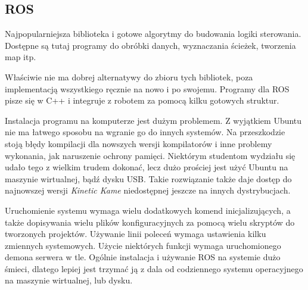 \subsection{ROS}
Najpopularniejsza biblioteka i gotowe algorytmy do budowania logiki sterowania.
Dostępne są tutaj programy do obróbki danych, wyznaczania ścieżek, tworzenia map itp.

Właściwie nie ma dobrej alternatywy do zbioru tych bibliotek, poza implementacją wszystkiego ręcznie na nowo i po swojemu.
Programy dla ROS pisze się w C++ i integruje z robotem za pomocą kilku gotowych struktur.

Instalacja programu na komputerze jest dużym problemem.
Z wyjątkiem Ubuntu nie ma łatwego sposobu na wgranie go do innych systemów.
Na przeszkodzie stoją błędy kompilacji dla nowszych wersji kompilatorów i inne problemy wykonania, jak naruszenie ochrony pamięci. 
Niektórym studentom wydziału się udało tego z wielkim trudem dokonać, lecz dużo prościej jest użyć Ubuntu na maszynie wirtualnej, bądź dysku USB.
Takie rozwiązanie także daje dostęp do najnowszej wersji \emph{Kinetic Kame} niedostępnej jeszcze na innych dystrybucjach.

Uruchomienie systemu wymaga wielu dodatkowych komend inicjalizujących, a także dopisywania wielu plików konfiguracyjnych za pomocą wielu skryptów do tworzonych projektów.
Używanie linii poleceń wymaga ustawienia kilku zmiennych systemowych.
Użycie niektórych funkcji wymaga uruchomionego demona serwera w tle.
Ogólnie instalacja i używanie ROS na systemie dużo śmieci, dlatego lepiej jest trzymać ją z dala od codziennego systemu operacyjnego na maszynie wirtualnej, lub dysku.


